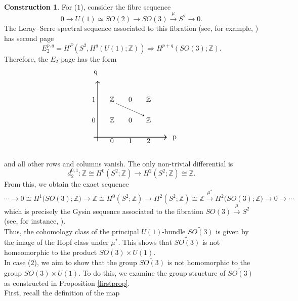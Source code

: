 \documentclass{article}
\theoremstyle{plain}
\theoremstyle{definition}
\newtheorem{const}[thm]{Construction}
\begin{document}
\begin{const}
For ($1$), consider the fibre sequence
\[
0 \longrightarrow U(1) \simeq SO(2) \longrightarrow  SO(3) \overset{\mu}\longrightarrow S^2 \longrightarrow 0.
\]
The Leray–Serre spectral sequence associated to this fibration (see, for example, \cite[Chapter 3 on page 177]{MR658304}) has second page
\[
E^{p,q}_2 = H^P\left(S^2,H^q\left(U(1);\mathbb{Z}\right)\right) \Longrightarrow H^{p+q}\left(SO(3);\mathbb{Z}\right).
\]
Therefore, the $E_2$-page has the form
\[
\begin{tikzpicture}
  \matrix (m) [matrix of math nodes,
    nodes in empty cells,nodes={minimum width=5ex,
    minimum height=5ex,outer sep=-5pt},
    column sep=1ex,row sep=1ex]{
                &      &     &     & \\
          1     &  \mathbb{Z} &  0  & \mathbb{Z} & \\
          0     &  \mathbb{Z}  & 0 &  \mathbb{Z}  & \\
    \quad\strut &   0  &  1  &  2  & \strut \\};
 \draw[-stealth] (m-2-2.south east) -- (m-3-4.north west);
\draw[thick,->] (m-4-1.east) -- (m-1-1.east) ;
\draw[thick,->] (m-4-1.north) -- (m-4-5.north) ;
\draw (2.2,-1.1) node[below] {p};
\draw (-1.5,1.9) node[left] {q};
\end{tikzpicture}
\]
and all other rows and columns vanish. The only non-trivial differential is
$$d_2^{0,1}:\mathbb{Z} \cong H^0(S^2;\mathbb{Z}) \longrightarrow H^2(S^2;\mathbb{Z}) \cong \mathbb{Z}.$$
From this, we obtain the exact sequence
\[
\cdots \longrightarrow 0 \cong H^1\bigl(SO(3);\mathbb{Z}\bigr) \longrightarrow \mathbb{Z} \cong H^0(S^2;\mathbb{Z}) \longrightarrow  H^2(S^2;\mathbb{Z}) \cong \mathbb{Z} \overset{\mu^*} \longrightarrow H^2\bigl(SO(3);\mathbb{Z}\bigr) \longrightarrow 0 \longrightarrow \cdots
\]
which is precisely the Gysin sequence associated to the fibration $SO(3)\overset{\mu}{\longrightarrow}S^2$ (see, for instance, \cite[Chapter 3 on page 178]{MR658304}). \\
Thus, the cohomology class of the principal $U(1)$-bundle $\widetilde{SO(3)}$ is given by the image of the Hopf class under $\mu^*$. This shows that $\widetilde{SO(3)}$ is not homeomorphic to the product $SO(3)\times U(1)$. \\
In case ($2$), we aim to show that the group $\widetilde{SO(3)}$ is not homomorphic to the group $SO(3) \times U(1)$. To do this, we examine the group structure of $\widetilde{SO(3)}$ as constructed in Proposition \ref{firstprop}. \\
First, recall the definition of the map

\end{const}
\end{document}
